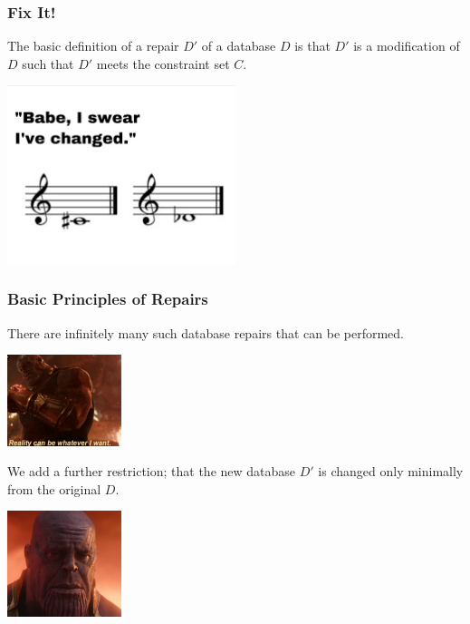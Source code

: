 \begin{frame}
\frametitle{Fix It!}

The basic definition of a repair $D'$ of a database $D$ is that $D'$ is a modification of $D$ such that $D'$ meets the constraint set $C$.

\begin{center}
	\includegraphics[width=0.5\textwidth]{images/changed.png}
\end{center}


\end{frame}


\begin{frame}
\frametitle{Basic Principles of Repairs}

There are infinitely many such database repairs that can be performed. 

\begin{center}
	\includegraphics[width=0.25\textwidth]{images/thanos1.jpeg}
\end{center}


We add a further restriction; that the new database $D'$ is changed only minimally from the original $D$.

\begin{center}
	\includegraphics[width=0.25\textwidth]{images/thanos2.jpg}
\end{center}

\end{frame}

